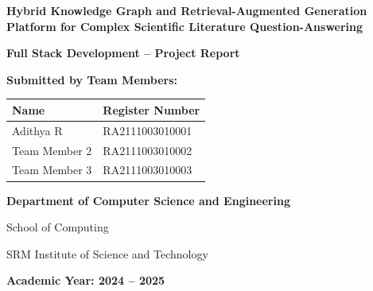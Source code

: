 \documentclass[12pt,a4paper,oneside]{report}
\begin{document}
\begin{titlepage}
    \centering
    \vspace*{0.5cm}
    
    {\Huge \bfseries Hybrid Knowledge Graph and Retrieval-Augmented Generation Platform for Complex Scientific Literature Question-Answering \par}
    
    \vspace{1.5cm}
    {\Large \textbf{Full Stack Development -- Project Report} \par}
    
    \vspace{2.0cm}
    
    {\large \textbf{Submitted by Team Members:} \par}
    \vspace{0.8cm}
    
    \begin{table}[h]
        \centering
        \large
        \begin{tabular}{ll}
            \textbf{Name} & \textbf{Register Number} \\
            \midrule
            Adithya R & RA2111003010001 \\
            Team Member 2 & RA2111003010002 \\
            Team Member 3 & RA2111003010003 \\
        \end{tabular}
    \end{table}
    
    \vspace{2.0cm}
    
    {\large \textbf{Department of Computer Science and Engineering} \par}
    {\large School of Computing \par}
    {\large SRM Institute of Science and Technology \par}
    
    \vfill
    
    {\large \textbf{Academic Year: 2024 -- 2025} \par}
    \vspace{0.5cm}
\end{titlepage}

\setcounter{page}{1}
\end{document}

